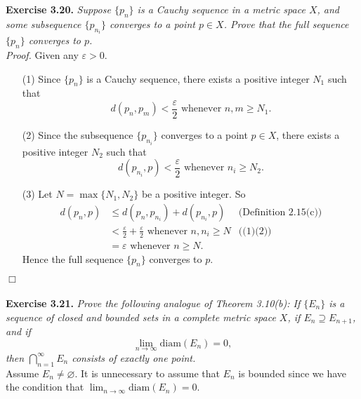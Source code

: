 \documentclass{article}
\begin{document}



\textbf{Exercise 3.20.}
\emph{Suppose $\{p_n\}$ is a Cauchy sequence in a metric space $X$,
and some subsequence $\{p_{n_i}\}$ converges to a point $p \in X$.
Prove that the full sequence $\{p_n\}$ converges to $p$. } \\

\emph{Proof.}
Given any $\varepsilon > 0$.
\begin{enumerate}
\item[(1)]
Since $\{p_n\}$ is a Cauchy sequence, there exists a positive integer $N_1$ such that
$$d(p_n,p_m) < \frac{\varepsilon}{2} \text{ whenever } n, m \geq N_1.$$
\item[(2)]
Since the subsequence $\{p_{n_i}\}$ converges to a point $p \in X$,
there exists a positive integer $N_2$ such that
$$d(p_{n_i},p) < \frac{\varepsilon}{2} \text{ whenever } n_i \geq N_2.$$
\item[(3)]
Let $N = \max\{N_1, N_2\}$ be a positive integer.
So
\begin{align*}
d(p_n,p)
&\leq d(p_n,p_{n_i}) + d(p_{n_i}, p)
  &\text{(Definition 2.15(c))} \\
&< \frac{\varepsilon}{2} + \frac{\varepsilon}{2} \text{ whenever } n, n_i \geq N
  &\text{((1)(2))} \\
&= \varepsilon \text{ whenever } n \geq N.
\end{align*}
Hence the full sequence $\{p_n\}$ converges to $p$.
\end{enumerate}
$\Box$ \\\\






\textbf{Exercise 3.21.}
\emph{Prove the following analogue of Theorem 3.10(b):
If $\{E_n\}$ is a sequence of closed and bounded sets in a complete metric space $X$,
if $E_n \supseteq E_{n+1}$, and if
$$\lim_{n \to \infty} \mathrm{diam}(E_n) = 0,$$
then $\bigcap_{n=1}^{\infty} E_n$ consists of exactly one point.} \\

Assume $E_n \neq \varnothing$. It is unnecessary to assume that $E_n$ is bounded
since we have the condition that $\lim_{n \to \infty} \mathrm{diam}(E_n) = 0$.\\
\end{document}
